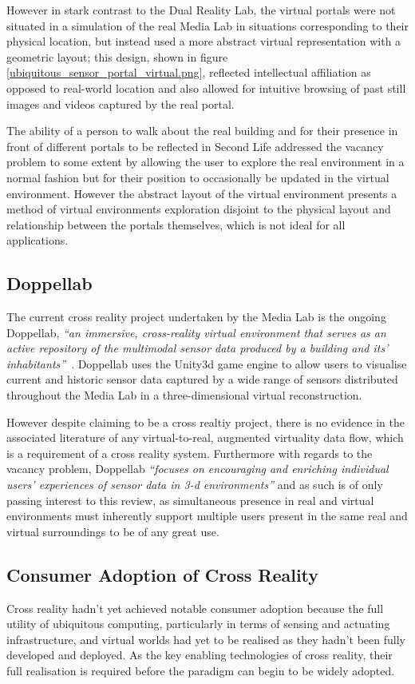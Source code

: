 However in stark contrast to the Dual Reality Lab, the virtual portals were not situated in a simulation of the real Media Lab in situations corresponding to their physical location, but instead used a more abstract virtual representation with a geometric layout; this design, shown in figure \ref{ubiquitous_sensor_portal_virtual.png}, reflected intellectual affiliation as opposed to real-world location and also allowed for intuitive browsing of past still images and videos captured by the real portal.

The ability of a person to walk about the real building and for their presence in front of different portals to be reflected in Second Life addressed the vacancy problem to some extent by allowing the user to explore the real environment in a normal fashion but for their position to occasionally be updated in the virtual environment. However the abstract layout of the virtual environment presents a method of virtual environments exploration disjoint to the physical layout and relationship between the portals themselves, which is not ideal for all applications.

\subsection{Doppellab}
\label{subsec:doppellab}
The current cross reality project undertaken by the Media Lab is the ongoing Doppellab, \textit{``an immersive, cross-reality virtual environment that serves as an active repository of the multimodal sensor data produced by a building and its' inhabitants''}~\cite{Dublon2011, Dublon2011a}. Doppellab uses the Unity3d game engine to allow users to visualise current and historic sensor data captured by a wide range of sensors distributed throughout the Media Lab in a three-dimensional virtual reconstruction.

However despite claiming to be a cross realtiy project, there is no evidence in the associated literature of any virtual-to-real, augmented virtuality data flow, which is a requirement of a cross reality system. Furthermore with regards to the vacancy problem, Doppellab \textit{``focuses on encouraging and enriching individual users' experiences of sensor data in 3-d environments''} and as such is of only passing interest to this review, as simultaneous presence in real and virtual environments must inherently support multiple users present in the same real and virtual surroundings to be of any great use.

\subsection{Consumer Adoption of Cross Reality}
\label{subsec:consumer_adoption_of_cross_reality}
Cross reality hadn't yet achieved notable consumer adoption because the full utility of ubiquitous computing, particularly in terms of sensing and actuating infrastructure, and virtual worlds had yet to be realised as they hadn't been fully developed and deployed. As the key enabling technologies of cross reality, their full realisation is required before the paradigm can begin to be widely adopted.


